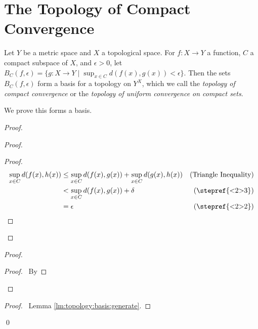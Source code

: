 \section{The Topology of Compact Convergence}

\begin{df}
  Let $Y$ be a metric space and $X$ a topological space. For $f : X \rightarrow Y$ a function, $C$ a compact subspace of $X$, and $\epsilon > 0$, let $B_C(f, \epsilon) = \{ g : X \rightarrow Y \mid \sup_{x \in C} d(f(x), g(x)) < \epsilon \}$. Then the sets $B_C(f, \epsilon)$ form a basis for a topology on $Y^X$, which we call the \emph{topology of compact convergence} or the \emph{topology of uniform convergence on compact sets}.

  We prove this forms a basis.
\end{df}

\begin{proof}
  \pf
  \begin{proof}
    \begin{proof}
      \pf
      \begin{align*}
        \sup_{x \in C} d(f(x),h(x)) & \leq \sup_{x \in C} d(f(x),g(x)) + \sup_{x \in C} d(g(x),h(x)) & (\text{Triangle Inequality}) \\
        & < \sup_{x \in C} d(f(x),g(x)) + \delta & (\text{\stepref{<2>3}}) \\
        & = \epsilon & (\text{\stepref{<2>2}})
      \end{align*}
    \end{proof}
  \end{proof}
  \begin{proof}
    \begin{proof}
      \pf\ By 
    \end{proof}
  \end{proof}
  \qedstep
  \begin{proof}
    \pf\ Lemma \ref{lm:topology:basis:generate}.
  \end{proof}
  \qed
\end{proof}

